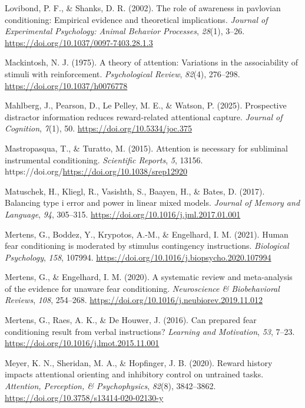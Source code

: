 \documentclass[
  man,
  floatsintext,
  longtable,
  nolmodern,
  notxfonts,
  notimes,
  mask,
  colorlinks=true,linkcolor=blue,citecolor=blue,urlcolor=blue]{apa7}
\newlength{\cslhangindent}
\newenvironment{CSLReferences}[2] %
 {\begin{list}{}{%
  \setlength{\itemindent}{0pt}
  \setlength{\leftmargin}{0pt}
  \setlength{\parsep}{0pt}
  \ifodd #1
   \setlength{\leftmargin}{\cslhangindent}
   \setlength{\itemindent}{-1\cslhangindent}
  \fi
  \setlength{\itemsep}{#2\baselineskip}}}
 {\end{list}}
\begin{document}
\begin{CSLReferences}{1}{0}
Lovibond, P. F., \& Shanks, D. R. (2002). The role of awareness in
pavlovian conditioning: Empirical evidence and theoretical implications.
\emph{Journal of Experimental Psychology: Animal Behavior Processes},
\emph{28}(1), 3--26. \url{https://doi.org/10.1037/0097-7403.28.1.3}

Mackintosh, N. J. (1975). A theory of attention: Variations in the
associability of stimuli with reinforcement. \emph{Psychological
Review}, \emph{82}(4), 276--298. \url{https://doi.org/10.1037/h0076778}

Mahlberg, J., Pearson, D., Le Pelley, M. E., \& Watson, P. (2025).
Prospective distractor information reduces reward-related attentional
capture. \emph{Journal of Cognition}, \emph{7}(1), 50.
\url{https://doi.org/10.5334/joc.375}

Mastropasqua, T., \& Turatto, M. (2015). Attention is necessary for
subliminal instrumental conditioning. \emph{Scientific Reports},
\emph{5}, 13156. https://doi.org/\url{https://doi.org/10.1038/srep12920}

Matuschek, H., Kliegl, R., Vasishth, S., Baayen, H., \& Bates, D.
(2017). Balancing type i error and power in linear mixed models.
\emph{Journal of Memory and Language}, \emph{94}, 305--315.
\url{https://doi.org/10.1016/j.jml.2017.01.001}

Mertens, G., Boddez, Y., Krypotos, A.-M., \& Engelhard, I. M. (2021).
Human fear conditioning is moderated by stimulus contingency
instructions. \emph{Biological Psychology}, \emph{158}, 107994.
\url{https://doi.org/10.1016/j.biopsycho.2020.107994}

Mertens, G., \& Engelhard, I. M. (2020). A systematic review and
meta-analysis of the evidence for unaware fear conditioning.
\emph{Neuroscience \& Biobehavioral Reviews}, \emph{108}, 254--268.
\url{https://doi.org/10.1016/j.neubiorev.2019.11.012}

Mertens, G., Raes, A. K., \& De Houwer, J. (2016). Can prepared fear
conditioning result from verbal instructions? \emph{Learning and
Motivation}, \emph{53}, 7--23.
\url{https://doi.org/10.1016/j.lmot.2015.11.001}

Meyer, K. N., Sheridan, M. A., \& Hopfinger, J. B. (2020). Reward
history impacts attentional orienting and inhibitory control on
untrained tasks. \emph{Attention, Perception, \& Psychophysics},
\emph{82}(8), 3842--3862.
\url{https://doi.org/10.3758/s13414-020-02130-y}


\end{CSLReferences}
\end{document}
